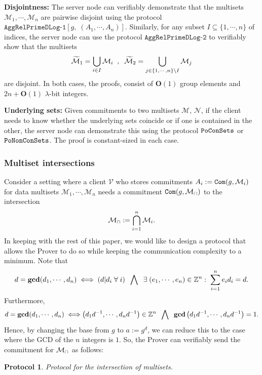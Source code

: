 \documentclass[11pt, lettersize, notitlepage, leqno, footskip=0.6cm]{article}
\newcommand{\bz}{\mathbb Z}
\newcommand{\ttt}{\texttt}
\newcommand{\LRA}{\Longleftrightarrow}
\newcommand{\wti}{\widetilde}
\newcommand{\mc}{\mathcal}
\newcommand{\mbf}{\mathbf}
\newcommand{\sm}{\setminus}
\newcommand{\lam}{\lambda}
\newcommand{\sub}{\subseteq}
\newcommand{\bO}{\mbf{O}}
\newcommand{\mcM}{\mc{M}}
\newcommand{\vs}{\vspace{-0.15cm}}
\newcommand{\noin}{\noindent}
\newcommand{\GCD}{\mbf{gcd}}
\newtheorem{Prot}[Thm]{Protocol}
\numberwithin{equation}{section}
\begin{document}
\bigskip


\noin \textbf{Disjointness:} The server node can verifiably demonstrate that the multisets $\mcM_1,\cdots,\mcM_n$ are pairwise disjoint using the protocol $\ttt{AggRelPrimeDLog-1}[g,\;(A_1,\cdots,A_n)]$. Similarly, for any subset $I\sub\{1,\cdots,n \}$ of indices, the server node can use the protocol $\ttt{AggRelPrimeDLog-2}$ to verifiably show that the multisets \vs $$\wti{\mcM}_1 = \bigcup\limits_{i\in I}\mcM_i\;\;,\;\;\wti{\mcM}_2 = \bigcup\limits_{j\in \{1,\cdots,n\}\sm I}\mcM_j \vs $$ are disjoint. In both cases, the proofs, consist of $\bO(1)$ group elements and $2n+\bO(1)$ $\lam$-bit integers.

\bigskip

\noin \textbf{Underlying sets:} Given commitments to two multisets $\mc{M}$, $\mc{N}$, if the client needs to know whether the underlying sets coincide or if one is contained in the other, the server  node can demonstrate this using the protocol $\tt{PoConSets}$ or  $\tt{PoNonConSets}$. The proof is constant-sized in each case.

\subsubsection{\fontsize{11}{11}\selectfont Multiset intersections }

\noin Consider a setting where a client $\mc{V}$ who stores commitments $A_i:= \protect{\ttt{Com}}(g, \mc{M}_i)$ for data multisets $\mc{M}_1, \cdots, \mc{M}_n$ needs a commitment $\protect{\verb|Com|}(g, \mc{M}_{\tt{\cap}})$ to the intersection \vs $$\mc{M}_{\tt{\cap}}:=\bigcap\limits_{i=1}^n \mc{M}_i .\vs $$ In keeping with the rest of this paper, we would like to design a protocol that allows the Prover to do so while keeping the communication complexity to a minimum. Note that \vspace{-0.2cm} $$d = \GCD(d_1,\cdots,d_n)\; \LRA\; (d|d_i\;\forall\;i)\;\;\bigwedge\;\; \exists\;(e_1,\cdots,e_n)\in\bz^n:\;\sum_{i=1}^n e_id_i = d . \vs $$ Furthermore, \vs $$d = \GCD(d_1,\cdots,d_n)\; \LRA \left({d_1}{d}^{-1},\cdots, {d_n}{d}^{-1}\right)\in \bz^n\;\;\bigwedge\;\; \GCD\left({d_1}{d}^{-1},\cdots, {d_n}{d}^{-1}\right)=1. \vs $$ Hence, by changing the base from $g$ to $a:= g^d$, we can reduce this to the case where the GCD of the $n$ integers is $1$. So, the Prover can verifiably send the commitment for $\mc{M}_{\tt{\cap}}$ as follows: \vspace{0.1cm}


\begin{Prot} Protocol for the intersection of multisets.\end{Prot} \vspace{-0.3cm}
\end{document}
